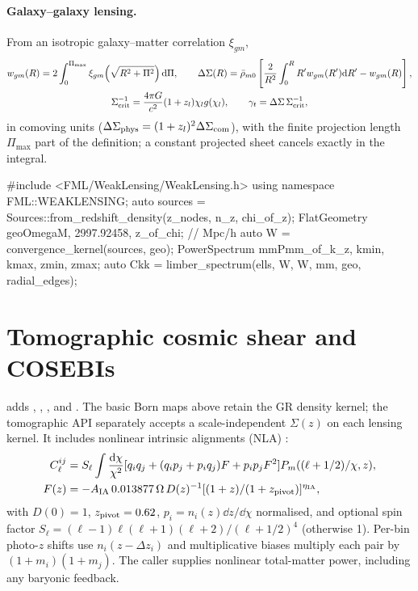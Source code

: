 \paragraph*{Galaxy--galaxy lensing.} From an isotropic galaxy--matter correlation $\xi_{gm}$,
\begin{gather}
w_{gm}(R)=2\int_0^{\Pi_{\max}}\xi_{gm}\!\left(\sqrt{R^2+\Pi^2}\right)\mathrm{d}\Pi,\qquad
\Delta\Sigma(R)=\bar\rho_{m0}\left[\frac{2}{R^2}\int_0^RR'w_{gm}(R')\mathrm{d} R'-w_{gm}(R)\right],\\
\Sigma_{\rm crit}^{-1}=\frac{4\pi G}{c^2}(1+z_l)\chi_lg(\chi_l),\qquad\gamma_t=\Delta\Sigma\,\Sigma_{\rm crit}^{-1},
\end{gather}
in comoving units ($\Delta\Sigma_{\rm phys}=(1+z_l)^2\Delta\Sigma_{\rm com}$), with the finite projection length $\Pi_{\max}$ part of the definition; a constant
projected sheet cancels exactly in the integral.

\begin{cppcode}
#include <FML/WeakLensing/WeakLensing.h>
using namespace FML::WEAKLENSING;
auto sources = Sources::from_redshift_density(z_nodes, n_z, chi_of_z);
FlatGeometry geo{OmegaM, 2997.92458, z_of_chi};        // Mpc/h
auto W = convergence_kernel(sources, geo);
PowerSpectrum mm{Pmm_of_k_z, kmin, kmax, zmin, zmax};
auto Ckk = limber_spectrum(ells, W, W, mm, geo, radial_edges);
\end{cppcode}

\section{Tomographic cosmic shear and COSEBIs}\label{sec:wl-cosmic-shear}

 adds , , ,
 and . The basic Born maps above retain the GR density kernel;
the tomographic API separately accepts a scale-independent  $\Sigma(z)$ on each lensing kernel.
It includes nonlinear intrinsic alignments (NLA) \cite{HirataSeljak2004,BridleKing2007}:
\begin{align}
C_\ell^{ij}&=S_\ell\int\frac{\mathrm{d}\chi}{\chi^2}
 [q_iq_j+(q_ip_j+p_iq_j)F+p_ip_jF^2]P_m((\ell+1/2)/\chi,z),\\
F(z)&=-A_{\rm IA}\,0.013877\,\Omega\,D(z)^{-1}
 [(1+z)/(1+z_{\rm pivot})]^{\eta_{\rm IA}},
\end{align}
with $D(0)=1$, $z_{\rm pivot}=0.62$, $p_i=n_i(z)\dd z/\dd\chi$ normalised, and optional spin factor
$S_\ell=(\ell-1)\ell(\ell+1)(\ell+2)/(\ell+1/2)^4$ (otherwise 1).
Per-bin photo-$z$ shifts use $n_i(z-\Delta z_i)$ and multiplicative biases multiply each pair by $(1+m_i)(1+m_j)$.
The caller supplies nonlinear total-matter power, including any baryonic feedback.

